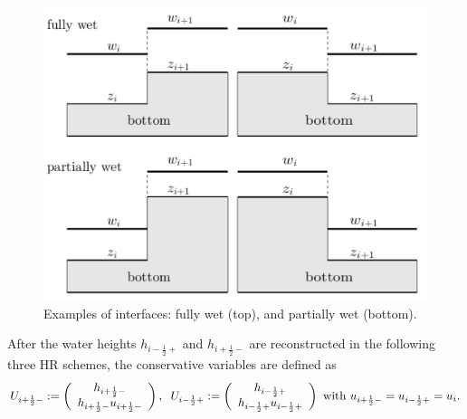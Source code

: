 \documentclass[11pt,a4paper,center,notitlepage]{article}
\numberwithin{equation}{section}
\begin{document}
\begin{figure}[H]
\centering
\includegraphics[scale=0.4]{1}
\caption{Examples of interfaces: fully wet (top), and partially wet (bottom).}
\label{fig1}
\end{figure}
After the water heights $h_{i-\frac{1}{2}+}$ and $h_{i+\frac{1}{2}-}$ are reconstructed in the following three HR schemes, the conservative variables are defined as 
\begin{align}
{U_{i + \frac{1}{2} - }}: = \left( {\begin{array}{*{20}{c}}
{{h_{i + \frac{1}{2} - }}}\\
{{h_{i + \frac{1}{2} - }}{u_{i + \frac{1}{2} - }}}
\end{array}} \right), \hspace{2mm} {U_{i - \frac{1}{2} + }}: = \left( {\begin{array}{*{20}{c}}
{{h_{i - \frac{1}{2} + }}}\\
{{h_{i - \frac{1}{2} + }}{u_{i - \frac{1}{2} + }}}
\end{array}} \right) \mbox{ with } {u_{i + \frac{1}{2} - }} = {u_{i - \frac{1}{2} + }} = {u_i}. 
\end{align}
\end{document}
